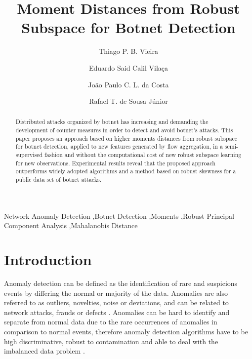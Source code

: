 \documentclass[review]{elsarticle}
\begin{document}
\begin{frontmatter}

\title{Moment Distances from Robust Subspace for Botnet Detection}

\author[unbaddress]{Thiago P. B. Vieira}
\author[unbaddress]{Eduardo Said Calil Vilaça}
\author[unbaddress,Ilmenauaddress,Fraunhoferaddress]{João Paulo C. L. da Costa}
\author[unbaddress]{Rafael T. de Sousa Júnior}

\address[unbaddress]{Department of Electrical Engineering, University of Brasilia (UnB), 70910-900, Brasília-DF, Brazil}
\address[Ilmenauaddress]{Institute for Information Technology, Ilmenau University of Technology, Ilmenau, Germany}
\address[Fraunhoferaddress]{Fraunhofer Institute for Integrated Circuits IIS, Erlangen, Germany}


\begin{abstract}
Distributed attacks organized by botnet has increasing and demanding the development of counter measures in order to detect and avoid botnet's attacks. This paper proposes an approach based on higher moments distances from robust subspace for botnet detection, applied to new features generated by flow aggregation, in a semi-supervised fashion and without the computational cost of new robust subspace learning for new observations. Experimental results reveal that the proposed approach outperforms widely adopted algorithms and a method based on robust skewness for a public data set of botnet attacks.
\end{abstract}

\begin{keyword}
Network Anomaly Detection \sep Botnet Detection \sep Moments \sep Robust Principal Component Analysis \sep Mahalanobis Distance
\end{keyword}

\end{frontmatter}

\linenumbers

\section{Introduction}
\label{sec:introduction}

Anomaly detection can be defined as the identification of rare and suspicions events by differing the normal or majority of the data. Anomalies are also referred to as outliers, novelties, noise or deviations, and can be related to network attacks, frauds or defects \cite{bhuyan2014network,ahmed2016survey}. Anomalies can be hard to identify and separate from normal data due to the rare occurrences of anomalies in comparison to normal events, therefore anomaly detection algorithms have to be high discriminative, robust to contamination and able to deal with the imbalanced data problem \cite{he2008learning}.
\end{document}
